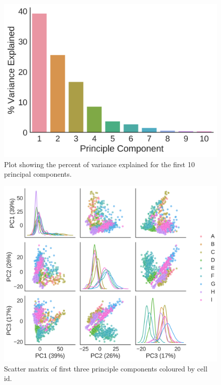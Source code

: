 \documentclass[alpha-refs]{wiley-article}
\begin{document}
\begin{figure}
	\centering
	\includegraphics[height=0.5\textheight]{img/qc/pca_scree}
	\caption{Plot showing the percent of variance explained for the first 10 principal components.}
	\label{fig:qc:scree}
\end{figure}

\begin{figure}
	\centering
	\includegraphics[height=0.5\textheight]{img/qc/cell_id}
	\caption{Scatter matrix of first three principle components coloured by cell id.}
	\label{fig:qc:cell_id}
\end{figure}
\end{document}
